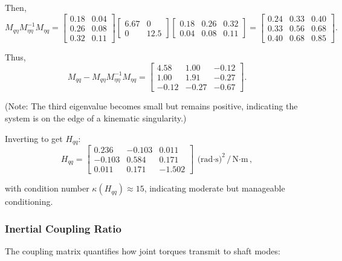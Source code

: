 Then,
\begin{equation}
M_{q\eta}M_{\eta\eta}^{-1}M_{\eta q} = \begin{bmatrix}
0.18 & 0.04 \\
0.26 & 0.08 \\
0.32 & 0.11
\end{bmatrix}
\begin{bmatrix}
6.67 & 0 \\
0 & 12.5
\end{bmatrix}
\begin{bmatrix}
0.18 & 0.26 & 0.32 \\
0.04 & 0.08 & 0.11
\end{bmatrix} = \begin{bmatrix}
0.24 & 0.33 & 0.40 \\
0.33 & 0.56 & 0.68 \\
0.40 & 0.68 & 0.85
\end{bmatrix}.
\end{equation}

Thus,
\begin{equation}
M_{qq}-M_{q\eta}M_{\eta\eta}^{-1}M_{\eta q} = \begin{bmatrix}
4.58 & 1.00 & -0.12 \\
1.00 & 1.91 & -0.27 \\
-0.12 & -0.27 & -0.67
\end{bmatrix}.
\end{equation}

(Note: The third eigenvalue becomes small but remains positive, indicating the system
is on the edge of a kinematic singularity.)

Inverting to get $H_{qq}$:
\begin{equation}
H_{qq} = \begin{bmatrix}
0.236 & -0.103 & 0.011 \\
-0.103 & 0.584 & 0.171 \\
0.011 & 0.171 & -1.502
\end{bmatrix}~\text{(rad$\cdot$s)}^2/\text{N$\cdot$m},
\label{eq:ch8:Hqq-numeric}
\end{equation}

with condition number $\kappa(H_{qq}) \approx 15$, indicating moderate but manageable
conditioning.

\subsubsection{Inertial Coupling Ratio}

The coupling matrix quantifies how joint torques transmit to shaft modes:

